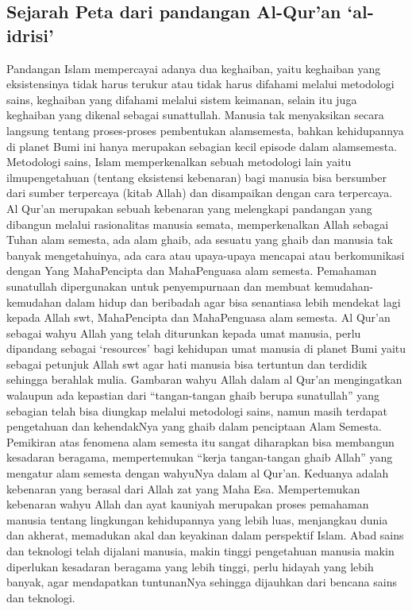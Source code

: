 \subsection {Sejarah Peta dari pandangan Al-Qur'an `al-idrisi'}
	Pandangan Islam mempercayai adanya dua keghaiban, yaitu keghaiban yang eksistensinya tidak harus terukur atau tidak harus difahami melalui metodologi sains, keghaiban yang difahami melalui sistem keimanan, selain itu juga keghaiban yang dikenal sebagai sunattullah. Manusia tak menyaksikan secara langsung tentang proses-proses pembentukan alamsemesta, bahkan kehidupannya di planet Bumi ini hanya merupakan sebagian kecil episode dalam alamsemesta.
	Metodologi sains, Islam memperkenalkan sebuah metodologi lain yaitu ilmupengetahuan (tentang eksistensi kebenaran) bagi manusia bisa bersumber dari sumber terpercaya (kitab Allah) dan disampaikan dengan cara terpercaya. Al Qur’an merupakan sebuah kebenaran yang melengkapi pandangan yang dibangun melalui rasionalitas manusia semata, memperkenalkan Allah sebagai Tuhan alam semesta, ada alam ghaib, ada sesuatu yang ghaib dan manusia tak banyak mengetahuinya, ada cara atau upaya-upaya mencapai atau berkomunikasi dengan Yang MahaPencipta dan MahaPenguasa alam semesta. Pemahaman sunatullah dipergunakan untuk penyempurnaan dan membuat kemudahan-kemudahan dalam hidup dan beribadah agar bisa senantiasa lebih mendekat lagi kepada Allah swt, MahaPencipta dan MahaPenguasa alam semesta.
	Al Qur’an sebagai wahyu Allah yang telah diturunkan kepada umat manusia, perlu dipandang sebagai `resources' bagi kehidupan umat manusia di planet Bumi yaitu sebagai petunjuk Allah swt agar hati manusia bisa tertuntun dan terdidik sehingga berahlak mulia. Gambaran wahyu Allah dalam al Qur'an mengingatkan walaupun ada kepastian dari “tangan-tangan ghaib berupa sunatullah” yang sebagian telah bisa diungkap melalui metodologi sains, namun masih terdapat pengetahuan dan kehendakNya yang ghaib dalam penciptaan Alam Semesta. 
	Pemikiran atas fenomena alam semesta itu sangat diharapkan bisa membangun kesadaran beragama, mempertemukan “kerja tangan-tangan ghaib Allah” yang mengatur alam semesta dengan wahyuNya dalam al Qur’an. Keduanya adalah kebenaran yang berasal dari Allah zat yang Maha Esa. Mempertemukan kebenaran wahyu Allah dan ayat kauniyah merupakan proses pemahaman manusia tentang lingkungan kehidupannya yang lebih luas, menjangkau dunia dan akherat, memadukan akal dan keyakinan dalam perspektif Islam. 
	Abad sains dan teknologi telah dijalani manusia, makin tinggi pengetahuan manusia makin diperlukan kesadaran beragama yang lebih tinggi, perlu hidayah yang lebih banyak, agar mendapatkan tuntunanNya sehingga dijauhkan dari bencana sains dan teknologi. 
